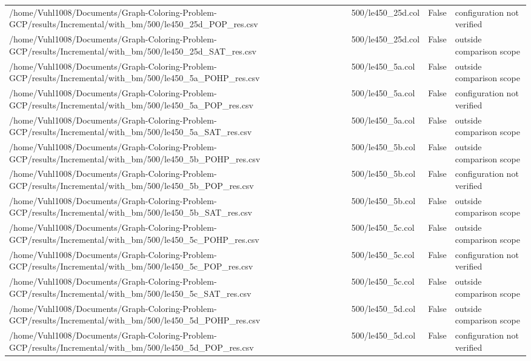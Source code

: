 \begin{table}[htbp]
\begin{tabular}{llll}
/home/Vuhl1008/Documents/Graph-Coloring-Problem-GCP/results/Incremental/with\_bm/500/le450\_25d\_POP\_res.csv & 500/le450\_25d.col & False & configuration not verified \\
/home/Vuhl1008/Documents/Graph-Coloring-Problem-GCP/results/Incremental/with\_bm/500/le450\_25d\_SAT\_res.csv & 500/le450\_25d.col & False & outside comparison scope \\
/home/Vuhl1008/Documents/Graph-Coloring-Problem-GCP/results/Incremental/with\_bm/500/le450\_5a\_POHP\_res.csv & 500/le450\_5a.col & False & outside comparison scope \\
/home/Vuhl1008/Documents/Graph-Coloring-Problem-GCP/results/Incremental/with\_bm/500/le450\_5a\_POP\_res.csv & 500/le450\_5a.col & False & configuration not verified \\
/home/Vuhl1008/Documents/Graph-Coloring-Problem-GCP/results/Incremental/with\_bm/500/le450\_5a\_SAT\_res.csv & 500/le450\_5a.col & False & outside comparison scope \\
/home/Vuhl1008/Documents/Graph-Coloring-Problem-GCP/results/Incremental/with\_bm/500/le450\_5b\_POHP\_res.csv & 500/le450\_5b.col & False & outside comparison scope \\
/home/Vuhl1008/Documents/Graph-Coloring-Problem-GCP/results/Incremental/with\_bm/500/le450\_5b\_POP\_res.csv & 500/le450\_5b.col & False & configuration not verified \\
/home/Vuhl1008/Documents/Graph-Coloring-Problem-GCP/results/Incremental/with\_bm/500/le450\_5b\_SAT\_res.csv & 500/le450\_5b.col & False & outside comparison scope \\
/home/Vuhl1008/Documents/Graph-Coloring-Problem-GCP/results/Incremental/with\_bm/500/le450\_5c\_POHP\_res.csv & 500/le450\_5c.col & False & outside comparison scope \\
/home/Vuhl1008/Documents/Graph-Coloring-Problem-GCP/results/Incremental/with\_bm/500/le450\_5c\_POP\_res.csv & 500/le450\_5c.col & False & configuration not verified \\
/home/Vuhl1008/Documents/Graph-Coloring-Problem-GCP/results/Incremental/with\_bm/500/le450\_5c\_SAT\_res.csv & 500/le450\_5c.col & False & outside comparison scope \\
/home/Vuhl1008/Documents/Graph-Coloring-Problem-GCP/results/Incremental/with\_bm/500/le450\_5d\_POHP\_res.csv & 500/le450\_5d.col & False & outside comparison scope \\
/home/Vuhl1008/Documents/Graph-Coloring-Problem-GCP/results/Incremental/with\_bm/500/le450\_5d\_POP\_res.csv & 500/le450\_5d.col & False & configuration not verified \\

\end{tabular}
\end{table}
